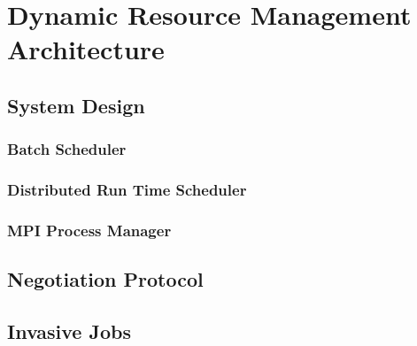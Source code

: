 \chapter{Dynamic Resource Management Architecture}\label{chapter:dynamic resource}
\section{System Design}
\subsection{Batch Scheduler}
\subsection{Distributed Run Time Scheduler}
\subsection{MPI Process Manager}
\section{Negotiation Protocol}
\section{Invasive Jobs}
